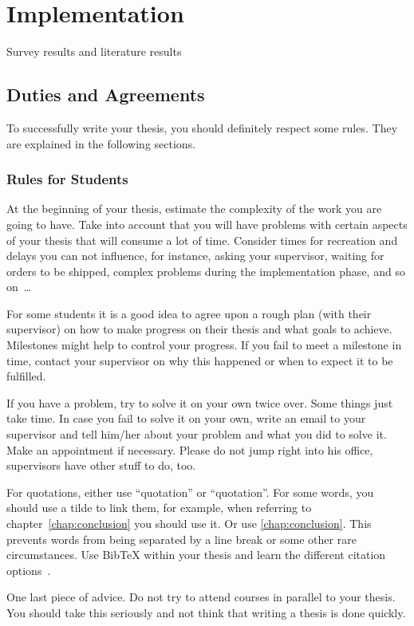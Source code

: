 \chapter{Implementation} \label{chap:impl}

Survey results and literature results

\section{Duties and Agreements}

To successfully write your thesis, you should definitely respect some rules. They are explained in the following sections.

\subsection{Rules for Students}
At the beginning of your thesis, estimate the complexity of the work you are going to have. Take into account that you will have problems with certain aspects of your thesis that will consume a lot of time. Consider times for recreation and delays you can not influence, for instance, asking your supervisor, waiting for orders to be shipped, complex problems during the implementation phase, and so on~\dots

For some students it is a good idea to agree upon a rough plan (with their supervisor) on how to make progress on their thesis and what goals to achieve. Milestones might help to control your progress. If you fail to meet a milestone in time, contact your supervisor on why this happened or when to expect it to be fulfilled.

If you have a problem, try to solve it on your own twice over. Some things just take time. In case you fail to solve it on your own, write an email to your supervisor and tell him/her about your problem and what you did to solve it. Make an appointment if necessary. Please do not jump right into his office, supervisors have other stuff to do, too.

For quotations, either use ``quotation'' or \enquote{quotation}. For some words, you should use a tilde to link them, for example, when referring to chapter~\ref{chap:conclusion} you should use it. Or use \autoref{chap:conclusion}. This prevents words from being separated by a line break or some other rare circumstances. Use BibTeX within your thesis and learn the different citation options~\cite{Xie:2008:SBS,Newsome:05:DTA}.

One last piece of advice. Do not try to attend courses in parallel to your thesis. You should take this seriously and not think that writing a thesis is done quickly.


